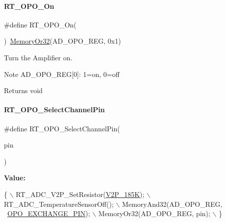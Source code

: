 \paragraph{\texorpdfstring{R\+T\+\_\+\+O\+P\+O\+\_\+\+On}{RT\_OPO\_On}}
{\footnotesize\ttfamily \#define R\+T\+\_\+\+O\+P\+O\+\_\+\+On(\begin{DoxyParamCaption}{ }\end{DoxyParamCaption})~\mbox{\hyperlink{a00020_a27874a97deab7cecdde5ddecf466e31e}{Memory\+Or32}}(A\+D\+\_\+\+O\+P\+O\+\_\+\+R\+EG, 0x1)}



Turn the Amplifier on. 

\begin{DoxyNote}{Note}
A\+D\+\_\+\+O\+P\+O\+\_\+\+R\+EG\mbox{[}0\mbox{]}\+: 1=on, 0=off 
\end{DoxyNote}
\begin{DoxyReturn}{Returns}
void 
\end{DoxyReturn}
\mbox{\label{a00002_aaa7081959e37104e40e3f637d42d5144}} 
\paragraph{\texorpdfstring{R\+T\+\_\+\+O\+P\+O\+\_\+\+Select\+Channel\+Pin}{RT\_OPO\_SelectChannelPin}}
{\footnotesize\ttfamily \#define R\+T\+\_\+\+O\+P\+O\+\_\+\+Select\+Channel\+Pin(\begin{DoxyParamCaption}\item[{}]{pin }\end{DoxyParamCaption})}

{\bfseries Value\+:}
\begin{DoxyCode}
\{                                               \(\backslash\)
        RT\_ADC\_V2P\_SetResistor(\mbox{\hyperlink{a00002_a80255c41c3764feff9b79664f15feb46aa035ba8725fe8565c5505a295c22ea8e}{V2P\_185K}});           \(\backslash\)
        RT\_ADC\_TemperatureSensorOff();              \(\backslash\)
        MemoryAnd32(AD\_OPO\_REG, ~\mbox{\hyperlink{a00002_af0663f5e9fee7a904ad95d1a4ecdaebda8866b250a87989e76add11875358e4ae}{OPO\_EXCHANGE\_PIN}}); \(\backslash\)
        MemoryOr32(AD\_OPO\_REG, pin);                \(\backslash\)
    \}
\end{DoxyCode}


